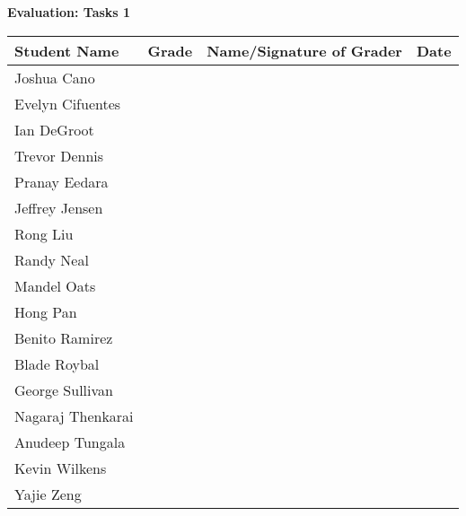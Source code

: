 \documentclass[11pt]{article}
\begin{document}
\begin{center}
{\bfseries \LARGE Evaluation: Tasks 1}
\end{center}

\begin{center}
\begin{tabular}{|p{1.75in}|p{0.75in}|p{2.5in}|p{0.75in}|}
\hline
\textbf{Student Name} & \textbf{Grade} & Name/Signature of Grader & Date \\
\hline
Joshua Cano & & & \\ \hline
Evelyn Cifuentes & & & \\ \hline
Ian DeGroot & & & \\ \hline
Trevor Dennis & & & \\ \hline
Pranay Eedara & & & \\ \hline
Jeffrey Jensen & & & \\ \hline
Rong Liu & & & \\ \hline
Randy Neal & & & \\ \hline
Mandel Oats & & & \\ \hline
Hong Pan & & & \\ \hline
Benito Ramirez & & & \\ \hline
Blade Roybal & & & \\ \hline
George Sullivan & & & \\ \hline
Nagaraj Thenkarai & & & \\ \hline
Anudeep Tungala & & & \\ \hline
Kevin Wilkens & & & \\ \hline
Yajie Zeng & & & \\ \hline
\end{tabular}
\end{center}
\end{document}
